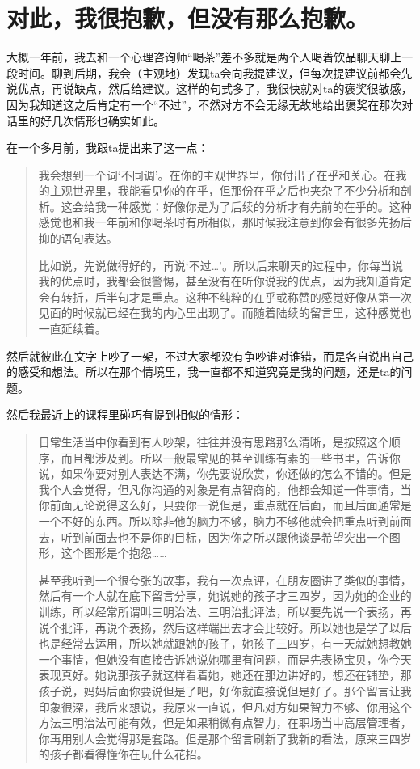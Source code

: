 \chapter{对此，我很抱歉，但没有那么抱歉。}



大概一年前，我去和一个心理咨询师“喝茶”\pozhehao{}差不多就是两个人喝着饮品聊天聊上一段时间。聊到后期，我会（主观地）发现ta会向我提建议，但每次提建议前都会先说优点，再说缺点，然后给建议。这样的句式多了，我很快就对ta的褒奖很敏感，因为我知道这之后肯定有一个“不过”，不然对方不会无缘无故地给出褒奖\pozhehao{}在那次对话里的好几次情形也确实如此。

在一个多月前，我跟ta提出来了这一点：

\blockquote{
	我会想到一个词‘不同调’。在你的主观世界里，你付出了在乎和关心。在我的主观世界里，我能看见你的在乎，但那份在乎之后也夹杂了不少分析和剖析。这会给我一种感觉：好像你是为了后续的分析才有先前的在乎的。这种感觉也和我一年前和你喝茶时有所相似，那时候我注意到你会有很多先扬后抑的语句表达。

	比如说，先说做得好的，再说‘不过…’。所以后来聊天的过程中，你每当说我的优点时，我都会很警惕，甚至没有在听你说我的优点，因为我知道肯定会有转折，后半句才是重点。这种不纯粹的在乎或称赞的感觉好像从第一次见面的时候就已经在我的内心里出现了。而随着陆续的留言里，这种感觉也一直延续着。
}

然后就彼此在文字上吵了一架，不过大家都没有争吵谁对谁错，而是各自说出自己的感受和想法。所以在那个情境里，我一直都不知道究竟是我的问题，还是ta的问题。

然后我最近上的课程里碰巧有提到相似的情形：

\blockquote{
	日常生活当中你看到有人吵架，往往并没有思路那么清晰，是按照这个顺序，而且都涉及到。所以一般最常见的甚至训练有素的一些书里，告诉你说，如果你要对别人表达不满，你先要说欣赏，你还做的怎么不错的。但是我个人会觉得，但凡你沟通的对象是有点智商的，他都会知道一件事情，当你前面无论说得这么好，只要你一说但是，重点就在后面，而且后面通常是一个不好的东西。所以除非他的脑力不够，脑力不够他就会把重点听到前面去，听到前面去也不是你的目标，因为你之所以跟他谈是希望突出一个图形，这个图形是个抱怨……

	甚至我听到一个很夸张的故事，我有一次点评，在朋友圈讲了类似的事情，然后有一个人就在底下留言分享，她说她的孩子才三四岁，因为她的企业的训练，所以经常所谓叫三明治法、三明治批评法，所以要先说一个表扬，再说个批评，再说个表扬，然后这样端出去才会比较好。所以她也是学了以后也是经常去运用，所以她就跟她的孩子，她孩子三四岁，有一天就她想教她一个事情，但她没有直接告诉她说她哪里有问题，而是先表扬宝贝，你今天表现真好。她说那孩子就这样看着她，她还在那边讲好的，想还在铺垫，那孩子说，妈妈后面你要说但是了吧，好你就直接说但是好了。那个留言让我印象很深，我后来想说，我原来一直说，但凡对方如果智力不够、你用这个方法三明治法可能有效，但是如果稍微有点智力，在职场当中高层管理者，你再用别人会觉得那是套路。但是那个留言刷新了我新的看法，原来三四岁的孩子都看得懂你在玩什么花招。
}


